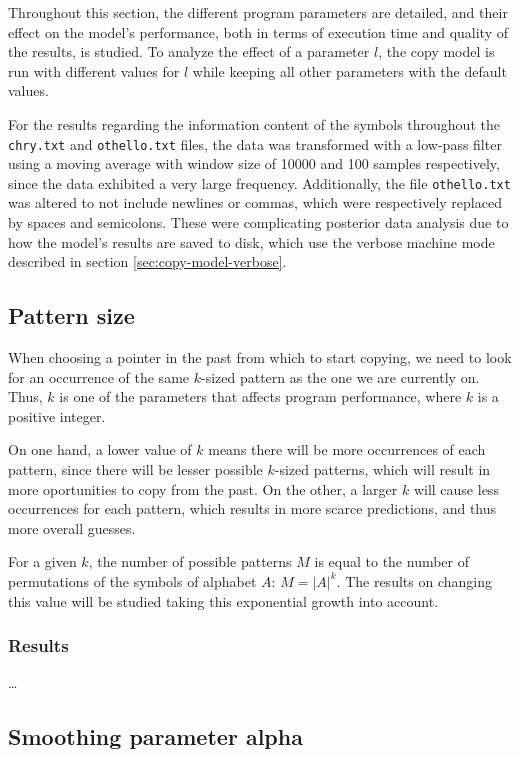 \documentclass{article}
\begin{document}
Throughout this section, the different program parameters are detailed, and their effect on the model's performance, both in terms of execution time and quality of the results, is studied.
To analyze the effect of a parameter $l$, the copy model is run with different values for $l$ while keeping all other parameters with the default values.

For the results regarding the information content of the symbols throughout the \verb|chry.txt| and \verb|othello.txt| files, the data was transformed with a low-pass filter using a moving average with window size of 10000 and 100 samples respectively, since the data exhibited a very large frequency.
Additionally, the file \verb|othello.txt| was altered to not include newlines or commas, which were respectively replaced by spaces and semicolons.
These were complicating posterior data analysis due to how the model's results are saved to disk, which use the verbose machine mode described in section \ref{sec:copy-model-verbose}.

\subsection{Pattern size}

When choosing a pointer in the past from which to start copying, we need to look for an occurrence of the same $k$-sized pattern as the one we are currently on.
Thus, $k$ is one of the parameters that affects program performance, where $k$ is a positive integer.

On one hand, a lower value of $k$ means there will be more occurrences of each pattern, since there will be lesser possible $k$-sized patterns, which will result in more oportunities to copy from the past.
On the other, a larger $k$ will cause less occurrences for each pattern, which results in more scarce predictions, and thus more overall guesses.

For a given $k$, the number of possible patterns $M$ is equal to the number of permutations of the symbols of alphabet $A$: $M = \vert A \vert ^ k$.
The results on changing this value will be studied taking this exponential growth into account.

\subsubsection{Results}

\dots

\subsection{Smoothing parameter alpha}
\end{document}
